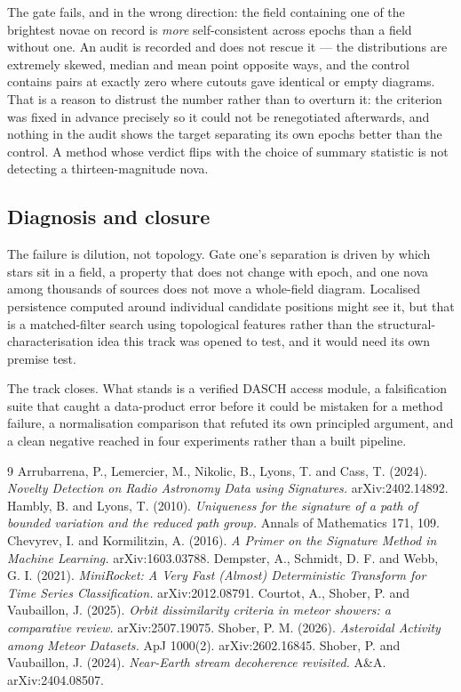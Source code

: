 \documentclass[11pt,a4paper]{report}
\begin{document}
The gate fails, and in the wrong direction: the field containing one of the brightest novae
on record is \emph{more} self-consistent across epochs than a field without one. An audit is
recorded and does not rescue it --- the distributions are extremely skewed, median and mean
point opposite ways, and the control contains pairs at exactly zero where cutouts gave
identical or empty diagrams. That is a reason to distrust the number rather than to overturn
it: the criterion was fixed in advance precisely so it could not be renegotiated afterwards,
and nothing in the audit shows the target separating its own epochs better than the control.
A method whose verdict flips with the choice of summary statistic is not detecting a
thirteen-magnitude nova.

\subsection{Diagnosis and closure}

The failure is dilution, not topology. Gate one's separation is driven by which stars sit in
a field, a property that does not change with epoch, and one nova among thousands of sources
does not move a whole-field diagram. Localised persistence computed around individual
candidate positions might see it, but that is a matched-filter search using topological
features rather than the structural-characterisation idea this track was opened to test, and
it would need its own premise test.

The track closes. What stands is a verified DASCH access module, a falsification suite that
caught a data-product error before it could be mistaken for a method failure, a normalisation
comparison that refuted its own principled argument, and a clean negative reached in four
experiments rather than a built pipeline.

\begin{thebibliography}{9}
 Arrubarrena, P., Lemercier, M., Nikolic, B., Lyons, T. and Cass, T. (2024).
\emph{Novelty Detection on Radio Astronomy Data using Signatures.} arXiv:2402.14892.
 Hambly, B. and Lyons, T. (2010). \emph{Uniqueness for the signature of a path
of bounded variation and the reduced path group.} Annals of Mathematics 171, 109.
 Chevyrev, I. and Kormilitzin, A. (2016). \emph{A Primer on the Signature
Method in Machine Learning.} arXiv:1603.03788.
 Dempster, A., Schmidt, D. F. and Webb, G. I. (2021). \emph{MiniRocket: A
Very Fast (Almost) Deterministic Transform for Time Series Classification.} arXiv:2012.08791.
 Courtot, A., Shober, P. and Vaubaillon, J. (2025). \emph{Orbit dissimilarity
criteria in meteor showers: a comparative review.} arXiv:2507.19075.
 Shober, P. M. (2026). \emph{Asteroidal Activity among Meteor Datasets.}
ApJ 1000(2). arXiv:2602.16845.
 Shober, P. and Vaubaillon, J. (2024). \emph{Near-Earth stream decoherence
revisited.} A\&A. arXiv:2404.08507.
\end{thebibliography}
\end{document}
